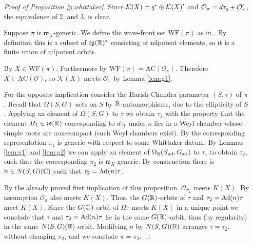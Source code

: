 \documentclass{article}
\theoremstyle{definition}
\numberwithin{equation}{section}
\renewcommand{\-}{\hyp{}}
\newcommand{\warn}[1]{{\leavevmode\color{red}[#1]}}
\newcommand{\g}{\mathfrak g}
\renewcommand{\O}{\mathcal O}
\newcommand{\K}{\mathcal K}
\newcommand{\w}{\mathfrak w}
\newcommand{\WF}{\mathrm{WF}}
\newcommand{\AC}{\mathrm{AC}}
\begin{document}
\begin{proof}[Proof of Proposition \ref{p:whittaker}]

Since $\K(X)=\mf{z}^* \oplus \K(X)'$ and $\O_\pi = d\tau_\mf{z} + \O_\pi'$, the equivalence of 2. and 3. is clear.

Suppose $\pi$ is $\w_X$-generic.
We define the wave-front set $\WF(\pi)$ as in \cite[Section 3]{matumoto}. By definition this is a subset of $i\g(\R)^*$ consisting of nilpotent elements,
so it is a finite union of nilpotent orbits.

By \cite[Theorem A]{matumoto}  $X\in \WF(\pi)$. 
Furthermore  by \cite[Theorem 1.2]{harris} $\WF(\pi)=\AC(\O_\pi)$.
Therefore  $X\in \AC(\O)$, so  $\K(X)$ meets $\O_\pi$ by 
Lemma \ref{lem:g1}.

For the opposite implication consider the Harish-Chandra parameter $(S,\tau)$ of $\pi$. Recall that $\Omega(S,G)$ acts on $S$ by $\mathbb{R}$-automorphisms, due to the ellipticity of $S$. Applying an element of $\Omega(S,G)$ to $\tau$ we obtain $\tau_1$ with the property that the element $H_1 \in i\mathfrak{s}(\mathbb{R})$ corresponding to $d\tau_1$ under $\kappa$ lies in a Weyl chamber whose simple roots are non-compact (such Weyl chambers exist). By \cite[Theorem 6.2(a,f)]{Vog78} the corresponding representation $\pi_1$ is generic with respect to some Whittaker datum. By Lemmas \ref{lem:g1} and \ref{lem:g2} we can apply an element of $\Omega_{\mathbb{R}}(S_{\textrm{ad}},G_{\textrm{ad}})$ to $\tau_1$ to obtain $\tau_2$, such that the corresponding $\pi_2$ is $\w_X$-generic. By construction there is $n \in N(S,G)(\mathbb{C})$ such that $\tau_2=\textrm{Ad}(n)\tau$.

By the already proved first implication of this proposition,
$\O_{\pi_2}$ meets $K(X)$. By assumption $\O_\pi$ also meets
$K(X)$. Thus, the $G(\mathbb{R})$-orbits of $\tau$ and
$\tau_2=\textrm{Ad}(n)\tau$ meet $K(X)$. Since the $G(\mathbb{C})$-orbit of
$H\tau$ meets $K(X)$ in a unique point we conclude that $\tau$
and $\tau_2=\textrm{Ad}(n)\tau$ lie in the same $G(\mathbb{R})$-orbit,
thus (by regularity) in the same $N(S,G)(\mathbb{R})$-orbit. Modifying $n$ by
$N(S,G)(\mathbb{R})$ arranges $\tau=\tau_2$,
without changing $\pi_2$, and we conclude $\pi=\pi_2$.
%
\end{proof}
\end{document}

